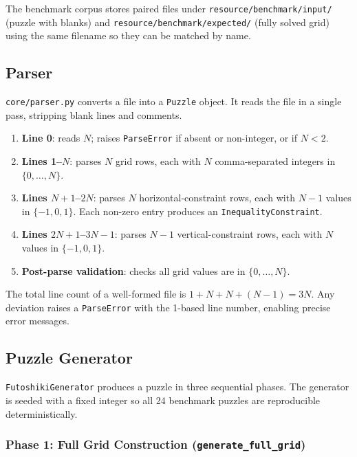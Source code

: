 The benchmark corpus stores paired files under
\texttt{resource/benchmark/input/} (puzzle with blanks) and
\texttt{resource/benchmark/expected/} (fully solved grid) using the same
filename so they can be matched by name.

\subsection{Parser}
\label{sec:parser}

\texttt{core/parser.py} converts a file into a \texttt{Puzzle} object.
It reads the file in a single pass, stripping blank lines and comments.

\begin{enumerate}
  \item \textbf{Line 0}: reads $N$; raises \texttt{ParseError} if absent or
        non-integer, or if $N < 2$.
  \item \textbf{Lines 1–$N$}: parses $N$ grid rows, each with $N$
        comma-separated integers in $\{0, \ldots, N\}$.
  \item \textbf{Lines $N+1$–$2N$}: parses $N$ horizontal-constraint rows,
        each with $N-1$ values in $\{-1, 0, 1\}$.
        Each non-zero entry produces an \texttt{InequalityConstraint}.
  \item \textbf{Lines $2N+1$–$3N-1$}: parses $N-1$ vertical-constraint rows,
        each with $N$ values in $\{-1, 0, 1\}$.
  \item \textbf{Post-parse validation}: checks all grid values are in
        $\{0, \ldots, N\}$.
\end{enumerate}

The total line count of a well-formed file is $1 + N + N + (N-1) = 3N$.
Any deviation raises a \texttt{ParseError} with the 1-based line number,
enabling precise error messages.

\subsection{Puzzle Generator}
\label{sec:generator}

\texttt{FutoshikiGenerator} produces a puzzle in three sequential phases.
The generator is seeded with a fixed integer so all 24 benchmark puzzles are
reproducible deterministically.

\subsubsection{Phase 1: Full Grid Construction (\texttt{generate\_full\_grid})}

